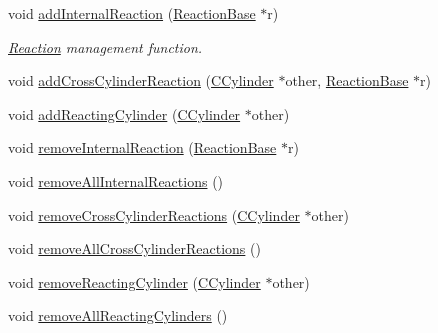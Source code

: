 \begin{DoxyCompactItemize}
\item 
void \hyperlink{classCCylinder_a53bed608f1b287eca275e0833a1233f1}{add\+Internal\+Reaction} (\hyperlink{classReactionBase}{Reaction\+Base} $\ast$r)
\begin{DoxyCompactList}\small\item\em \hyperlink{classReaction}{Reaction} management function. \end{DoxyCompactList}\item 
void \hyperlink{classCCylinder_a5535278dcbc8498e3006b5176858bddd}{add\+Cross\+Cylinder\+Reaction} (\hyperlink{classCCylinder}{C\+Cylinder} $\ast$other, \hyperlink{classReactionBase}{Reaction\+Base} $\ast$r)
\item 
void \hyperlink{classCCylinder_adeb2d133a53137e281b3134bfba5a4db}{add\+Reacting\+Cylinder} (\hyperlink{classCCylinder}{C\+Cylinder} $\ast$other)
\item 
void \hyperlink{classCCylinder_a9ee95b562068b9ffbc6c3b989be7af5f}{remove\+Internal\+Reaction} (\hyperlink{classReactionBase}{Reaction\+Base} $\ast$r)
\item 
void \hyperlink{classCCylinder_ae35ab9042ad585fa7ea9ba32ecd6e60f}{remove\+All\+Internal\+Reactions} ()
\item 
void \hyperlink{classCCylinder_a4cb0c141bef0820e345b5e3c756fa163}{remove\+Cross\+Cylinder\+Reactions} (\hyperlink{classCCylinder}{C\+Cylinder} $\ast$other)
\item 
void \hyperlink{classCCylinder_a7767880083ceda061babd4225557d7c3}{remove\+All\+Cross\+Cylinder\+Reactions} ()
\item 
void \hyperlink{classCCylinder_a3aecfb4bb31a032ccb73200f71f40ed9}{remove\+Reacting\+Cylinder} (\hyperlink{classCCylinder}{C\+Cylinder} $\ast$other)
\item 
void \hyperlink{classCCylinder_a97f1758093c7275bdb17ac92b6a05117}{remove\+All\+Reacting\+Cylinders} ()
\end{DoxyCompactItemize}

